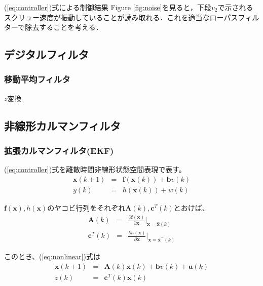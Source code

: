 \documentclass[twocolumn,oneside,a4paper]{article}
\begin{document}
(\ref{eq:controller})式による制御結果
Figure \ref{fig:noise}を見ると，下段$v_2$で示されるスクリュー速度が振動していることが読み取れる．これを適当なローパスフィルターで除去することを考える．


\subsection{デジタルフィルタ}
\subsubsection{移動平均フィルタ}
$z$変換


\subsection{非線形カルマンフィルタ}
\subsubsection{拡張カルマンフィルタ(EKF)}
(\ref{eq:controller})式を離散時間非線形状態空間表現で表す。
\begin{eqnarray*}\label{eq:nonlinear}
\bm{x}(k+1) &=& \bm{f}(\bm{x}(k))+\bm{b}v(k)\\
y(k) &=& h(\bm{x}(k))+w(k)
\end{eqnarray*}

$\bm{f}(\bm{x}), h(\bm{x})$のヤコビ行列をそれぞれ$\bm{A}(k), \bm{c}^T(k)$とおけば、
\begin{eqnarray*}
\bm{A}(k) &=& \frac{\partial \bm{f}(\bm{x})}{\partial \bm{x}} \bigg| _{\bm{x}=\hat{\bm{x}}(k)}\\
\bm{c}^T(k) &=& \frac{\partial h(\bm{x})}{\partial \bm{x} } \bigg| _{\bm{x}=\hat{\bm{x}}^{-}(k)}
\end{eqnarray*}


このとき、(\ref{eq:nonlinear})式は
\begin{eqnarray*}
\bm{x}(k+1) &=& \bm{A}(k)\bm{x}(k) + \bm{b}v(k)+\bm{u}(k)\\
z(k) &=& \bm{c}^T(k)\bm{x}(k)
\end{eqnarray*}
\end{document}
